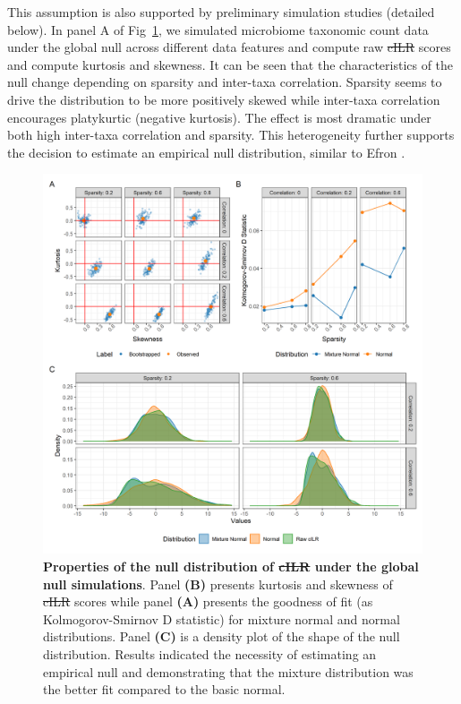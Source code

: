 \documentclass[10pt,letterpaper]{article}
\providecommand{\DIFaddtex}[1]{{\protect\color{blue}\uwave{#1}}} %
\providecommand{\DIFdeltex}[1]{{\protect\color{red}\sout{#1}}}                      %
\providecommand{\DIFaddbegin}{} %
\providecommand{\DIFaddend}{} %
\providecommand{\DIFdelbegin}{} %
\providecommand{\DIFdelend}{} %
\providecommand{\DIFaddFL}[1]{\DIFadd{#1}} %
\providecommand{\DIFdelFL}[1]{\DIFdel{#1}} %
\providecommand{\DIFaddbeginFL}{} %
\providecommand{\DIFaddendFL}{} %
\providecommand{\DIFdelbeginFL}{} %
\providecommand{\DIFdelendFL}{} %
\providecommand{\DIFadd}[1]{\texorpdfstring{\DIFaddtex{#1}}{#1}} %
\providecommand{\DIFdel}[1]{\texorpdfstring{\DIFdeltex{#1}}{}} %
\newcommand{\DIFscaledelfig}{0.5}
\newlength{\DIFdelgraphicswidth} %
\newlength{\DIFdelgraphicsheight} %
\newcommand{\DIFaddincludegraphics}[2][]{{\color{blue}\fbox{\DIFOincludegraphics[#1]{#2}}}} %
\newcommand{\DIFdelincludegraphics}[2][]{%
\sbox{\DIFdelgraphicsbox}{\DIFOincludegraphics[#1]{#2}}%
\settoboxwidth{\DIFdelgraphicswidth}{\DIFdelgraphicsbox} %
\settoboxtotalheight{\DIFdelgraphicsheight}{\DIFdelgraphicsbox} %
\scalebox{\DIFscaledelfig}{%
\parbox[b]{\DIFdelgraphicswidth}{\usebox{\DIFdelgraphicsbox}\\[-\baselineskip] \rule{\DIFdelgraphicswidth}{0em}}\llap{\resizebox{\DIFdelgraphicswidth}{\DIFdelgraphicsheight}{%
\setlength{\unitlength}{\DIFdelgraphicswidth}%
\begin{picture}(1,1)%
\thicklines\linethickness{2pt} %
{\color[rgb]{1,0,0}\put(0,0){\framebox(1,1){}}}%
{\color[rgb]{1,0,0}\put(0,0){\line( 1,1){1}}}%
{\color[rgb]{1,0,0}\put(0,1){\line(1,-1){1}}}%
\end{picture}%
}\hspace*{3pt}}} %
} %
\DeclareRobustCommand{\DIFaddbegin}{\DIFOaddbegin \let\includegraphics\DIFaddincludegraphics} %
\DeclareRobustCommand{\DIFaddend}{\DIFOaddend \let\includegraphics\DIFOincludegraphics} %
\DeclareRobustCommand{\DIFdelbegin}{\DIFOdelbegin \let\includegraphics\DIFdelincludegraphics} %
\DeclareRobustCommand{\DIFdelend}{\DIFOaddend \let\includegraphics\DIFOincludegraphics} %
\DeclareRobustCommand{\DIFaddbeginFL}{\DIFOaddbeginFL \let\includegraphics\DIFaddincludegraphics} %
\DeclareRobustCommand{\DIFaddendFL}{\DIFOaddendFL \let\includegraphics\DIFOincludegraphics} %
\DeclareRobustCommand{\DIFdelbeginFL}{\DIFOdelbeginFL \let\includegraphics\DIFdelincludegraphics} %
\DeclareRobustCommand{\DIFdelendFL}{\DIFOaddendFL \let\includegraphics\DIFOincludegraphics} %
\begin{document}
This assumption is also supported by preliminary simulation studies (detailed below). In panel A of Fig~\ref{fig:1}, we simulated microbiome taxonomic count data under the global null across different data features and compute raw \DIFdelbegin \DIFdel{cILR }\DIFdelend \DIFaddbegin \DIFadd{CBEA }\DIFaddend scores and compute kurtosis and skewness. It can be seen that the characteristics of the null change depending on sparsity and inter-taxa correlation. Sparsity seems to drive the distribution to be more positively skewed while inter-taxa correlation encourages platykurtic (negative kurtosis). The effect is most dramatic under both high inter-taxa correlation and sparsity. This heterogeneity further supports the decision to estimate an empirical null distribution, similar to Efron \cite{efron2004}. 

\begin{figure} [!h]
    \centering
    \includegraphics[width=\linewidth]{figures/kurtosis_skewness_gof.png}
    \caption{{\bf Properties of the null distribution of \DIFdelbeginFL \DIFdelFL{cILR }\DIFdelendFL \DIFaddbeginFL \DIFaddFL{CBEA }\DIFaddendFL under the global null simulations}. Panel \textbf{(B)} presents kurtosis and skewness of \DIFdelbeginFL \DIFdelFL{cILR }\DIFdelendFL \DIFaddbeginFL \DIFaddFL{CBEA }\DIFaddendFL scores while panel \textbf{(A)} presents the goodness of fit (as Kolmogorov-Smirnov D statistic) for mixture normal and normal distributions. Panel \textbf{(C)} is a density plot of the shape of the null distribution. Results indicated the necessity of estimating an empirical null and demonstrating that the mixture distribution was the better fit compared to the basic normal.}
    \label{fig:1}
\end{figure}
\end{document}
